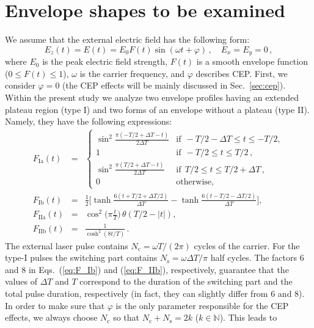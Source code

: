 \documentclass[preprint,aps,prd,showpacs,floatfix]{revtex4-1}
\begin{document}
\section{Envelope shapes to be examined}\label{sec:env_shape}
We assume that the external electric field has the following form:
%
\begin{equation}
E_z (t) = E(t) = E_0 F(t) \sin (\omega t + \varphi)\,,\quad E_x = E_y = 0\,,\label{eq:field_gen}
\end{equation}
%
where $E_0$ is the peak electric field strength, $F(t)$ is a smooth envelope function ($0 \leq F(t) \leq 1$), $\omega$ is the carrier frequency, and $\varphi$ describes CEP. First, we consider $\varphi = 0$ (the CEP effects will be mainly discussed in Sec.~\ref{sec:cep}). Within the present study we analyze two envelope profiles having an extended plateau region (type I) and two forms of an envelope without a plateau (type II). Namely, they have the following expressions:
%
\begin{eqnarray}
F_\text{Ia} (t) &=& 
\begin{cases}
\sin^2 \frac{\pi (- T/2 + \Delta T - t)}{2 \Delta T} &\text{if}~~ - T/2 -\Delta T \leq t \leq -T/2,\\
1 &\text{if}~~-T/2 \leq t \leq T/2\,,\\
\sin^2 \frac{\pi (T/2 + \Delta T - t)}{2 \Delta T} &\text{if}~~T/2 \leq t \leq T/2 + \Delta T\,,\\
0 &\text{otherwise},
\end{cases} \label{eq:F_Ia}\\
F_\text{Ib} (t) &=& \frac{1}{2} \bigg [ \tanh \frac{6 (t+T/2+\Delta T/2)}{\Delta T} - \tanh \frac{6 (t-T/2-\Delta T/2)}{\Delta T} \bigg ], \label{eq:F_Ib}\\
F_\text{IIa} (t) &=& \cos^2 \bigg ( \pi \frac{t}{T} \bigg ) \, \theta (T/2 - |t|), \label{eq:F_IIa}\\
F_\text{IIb} (t) &=& \frac{1}{\cosh^2 (8t/T)}\,. \label{eq:F_IIb}
\end{eqnarray}
%
The external laser pulse contains $N_\text{c} = \omega T/(2\pi)$ cycles of the carrier. For the type-I pulses the switching part contains $N_\text{s} = \omega \Delta T /\pi$ half cycles. The factors $6$ and $8$ in Eqs.~(\ref{eq:F_Ib}) and (\ref{eq:F_IIb}), respectively, guarantee that the values of $\Delta T$ and $T$ correspond to the duration of the switching part and the total pulse duration, respectively (in fact, they can slightly differ from $6$ and $8$). In order to make sure that $\varphi$ is the only parameter responsible for the CEP effects, we always choose $N_\text{c}$ so that $N_\text{c} + N_\text{s} = 2k$ ($k \in \mathbb{N}$). This leads to
\end{document}
